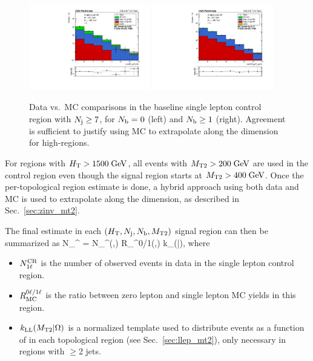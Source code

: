 \begin{figure}[ht]
  \begin{center}
    \includegraphics[width=0.47\textwidth]{figs/llep/crslbase_nJet30_ge7j_0b.pdf}
    \includegraphics[width=0.47\textwidth]{figs/llep/crslbase_nJet30_ge7j_ge1b.pdf}
    \caption{Data vs.\ MC \Nj comparisons in the baseline single lepton control region with $N_{\mathrm{j}}\geq7$,
      for $N_{\mathrm{b}}=0$ (left) and $N_{\mathrm{b}}\geq1$ (right). Agreement is sufficient to justify using MC to extrapolate
      along the \Nj dimension for high-\Nj regions.
            }
    \label{fig:llep_njextrap}
  \end{center}
\end{figure}

For regions with $H_{\mathrm{T}}>1500\;\text{Ge\hspace{-.08em}V}$, all events with
$M_{\mathrm{T2}}>200\;\text{Ge\hspace{-.08em}V}$ are used in the control region even though the signal region starts at $M_{\mathrm{T2}}>400\;\text{Ge\hspace{-.08em}V}$.
Once the per-topological region estimate is done, a hybrid approach using both data and MC is
used to extrapolate along the \mttwo dimension, as described in Sec.~\ref{sec:zinv_mt2}.

The final estimate in each $(H_{\mathrm{T}},N_{\mathrm{j}},N_{\mathrm{b}},M_{\mathrm{T2}})$ signal region can then be summarized as
\be\label{eq:llep_est}
N_{}^ = N_\mrm{1\ell}^(\mttwo,\Omega)\; R_^{0\ell/1\ell}(\mttwo,\Omega)\;
k_(\mttwo|\Omega),
\ee
where
\begin{itemize}\setlength\itemsep{0mm}
\item $N_{\mathrm{1\ell}}^{\mathrm{CR}}$ is the number of observed events in data in the single lepton control region.
\item $R_{\mathrm{MC}}^{0\ell/1\ell}$ is the ratio between zero lepton and single lepton MC yields in this region.
\item $k_{\mathrm{LL}}(M_{\mathrm{T2}}|\Omega)$ is a normalized template used to distribute events as a function
of \mttwo in each topological region (see Sec.~\ref{sec:llep_mt2}), only necessary in regions with $\geq$2 jets.
\end{itemize}



